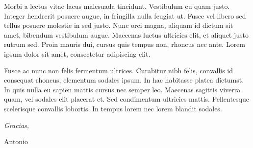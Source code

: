 \begin{acknowledgements}
Morbi a lectus vitae lacus malesuada tincidunt. Vestibulum eu quam justo. Integer hendrerit posuere augue, in fringilla nulla feugiat ut. Fusce vel libero sed tellus posuere molestie in sed justo. Nunc orci magna, aliquam id dictum sit amet, bibendum vestibulum augue. Maecenas luctus ultricies elit, et aliquet justo rutrum sed. Proin mauris dui, cursus quis tempus non, rhoncus nec ante. Lorem ipsum dolor sit amet, consectetur adipiscing elit.

Fusce ac nunc non felis fermentum ultrices. Curabitur nibh felis, convallis id consequat rhoncus, elementum sodales ipsum. In hac habitasse platea dictumst. In quis nulla eu sapien mattis cursus nec semper leo. Maecenas sagittis viverra quam, vel sodales elit placerat et. Sed condimentum ultricies mattis. Pellentesque scelerisque convallis lobortis. In tempus lorem nec lorem blandit sodales. 


\begin{flushright}
\textit{Gracias,}

Antonio

\monthname \ \the\year







\end{flushright}



\end{acknowledgements}




